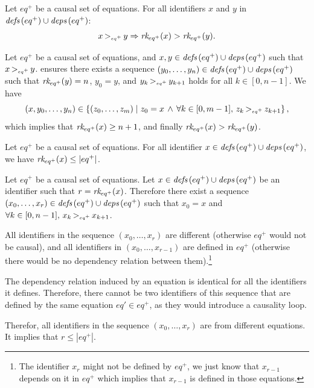 \begin{lemma}
    \label{lem:semantics:grsync:causality:rank:decrease}
    Let $eq^+$ be a causal set of equations.
    For all identifiers $x$ and $y$ in $\defs{eq^+} \cup \deps{eq^+}$:
    $$\depOrd{eq^+}{x}{y} \Rightarrow \rank{eq^+}{x} > \rank{eq^+}{y}.$$
\end{lemma}
\begin{skippableproof}
    Let $eq^+$ be a causal set of equations, and $x, y \in \defs{eq^+} \cup \deps{eq^+}$ such that
    $\depOrd{eq^+}{x}{y}$.
     ensures there exists a sequence
    $(y_0, \dots, y_n) \in \defs{eq^+} \cup \deps{eq^+}$ such that $\rank{eq^+}{y} = n$, $y_0 = y$,
    and $\depOrd{eq^+}{y_k}{y_{k+1}}$ holds for all $k \in [0, n - 1]$. We have
    $$
        (x, y_0, \dots, y_n) \in \left\{(z_0, \dots, z_m) \mid
        z_0 = x \,
        \wedge \, \forall k \in [0, m - 1], \, \depOrd{eq^+}{z_k}{z_{k+1}}
        \right\},
    $$
    which implies that $\rank{eq^+}{x} \ge n+1$, and finally $\rank{eq^+}{x} > \rank{eq^+}{y}$.
\end{skippableproof}

\begin{lemma}[Bounded]
    \label{lem:semantics:grsync:causality:rank:bounded}
    Let $eq^+$ be a causal set of equations.
    For all identifier $x \in \defs{eq^+} \cup \deps{eq^+}$, we have $\rank{eq^+}{x} \le |eq^+|$.
\end{lemma}
\begin{skippableproof}
    Let $eq^+$ be a causal set of equations. Let $x \in \defs{eq^+} \cup \deps{eq^+}$ be an
    identifier such that $r = \rank{eq^+}{x}$.
    Therefore there exist a sequence $(x_0, \dots, x_r) \in \defs{eq^+} \cup \deps{eq^+}$ such that
    $x_0 = x$ and $\forall k \in [0, n - 1], \, \depOrd{eq^+}{x_k}{x_{k+1}}$.

    All identifiers in the sequence $(x_0, \dots, x_r)$ are different (otherwise $eq^+$ would not be
    causal), and all identifiers in $(x_0, \dots, x_{r-1})$ are defined in $eq^+$ (otherwise there
    would be no dependency relation between them).\footnote{The identifier $x_r$ might not be
        defined by $eq^+$, we just know that $x_{r-1}$ depends on it in $eq^+$ which implies that
        $x_{r-1}$ is defined in those equations.}

    The dependency relation induced by an equation is identical for all the identifiers it defines.
    Therefore, there cannot be two identifiers of this sequence that are defined by the same
    equation $eq' \in eq^+$, as they would introduce a causality loop.

    Therefor, all identifiers in the sequence $(x_0, \dots, x_r)$ are from different equations.
    It implies that $r \le |eq^+|$.
\end{skippableproof}

